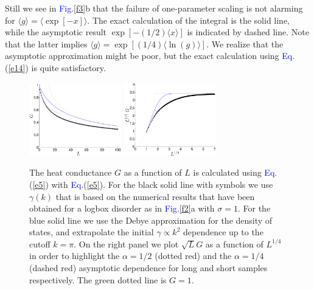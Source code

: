 \documentclass[twocolumn,showpacs,aps,pre]{revtex4-1}
\newcommand{\Eq}[1]{{\textcolor{blue}{Eq.}}(\ref{#1})}
\newcommand{\Fig}[1] {{\textcolor{blue}{Fig.}}\ref{#1}}
\begin{document}
Still we see in \Fig{f3}b that the failure of one-parameter scaling 
is not alarming for $\langle g \rangle = \langle \exp[-x] \rangle$.
The exact calculation of the integral is the solid line,
while the asymptotic result $\exp[-(1/2)\langle x \rangle]$ 
is indicated by dashed line. Note that the latter 
implies ${\langle g \rangle = \exp[(1/4)\langle\ln(g)\rangle]}$. 
We realize that the asymptotic approximation might be poor, 
but the exact calculation using \Eq{e14} is quite satisfactory. 


\begin{figure}

\includegraphics[clip,width=4cm]{G_versus_L}
\includegraphics[clip,width=4cm]{GsqrtL_sqrtL}

\caption{
The heat conductance $G$ as a function of $L$ is calculated using \Eq{e5} with \Eq{e5}.
For the black solid line with symbols we use $\gamma(k)$ that is based on the numerical
results that have been obtained for a logbox disorder as in \Fig{f2}a with ${\sigma=1}$.  
For the blue solid line we use the Debye approximation for the density 
of states, and extrapolate the initial $\gamma\propto k^2$ dependence up to the cutoff $k=\pi$.  
%
On the right panel we plot $\sqrt{L}G$ as a function of $L^{1/4}$ 
in order to highlight the ${\alpha=1/2}$ (dotted red) and the ${\alpha=1/4}$ (dashed red)
asymptotic dependence for long and short samples respectively. 
The green dotted line is $G=1$. }

\label{f4}
\end{figure}
\end{document}
